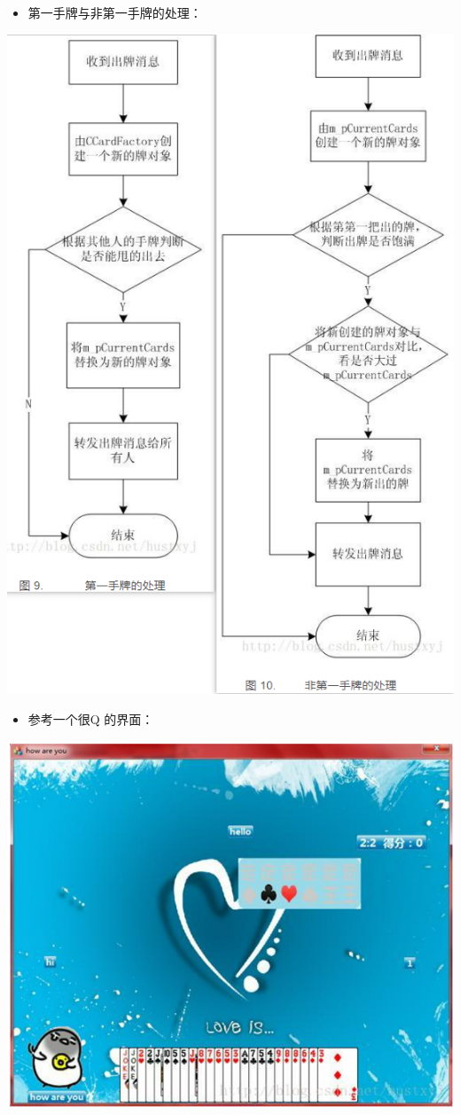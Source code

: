 \documentclass[9pt, b5paper]{article}
\begin{document}
\begin{itemize}
\item 第一手牌与非第一手牌的处理：
\end{itemize}

\begin{center}
\includegraphics[width=.9\linewidth]{./pic/plan_20230508_223827.png}
\end{center}

\begin{itemize}
\item 参考一个很Q 的界面：
\end{itemize}

\begin{center}
\includegraphics[width=.9\linewidth]{./pic/plan_20230508_222717.png}
\end{center}
\end{document}
